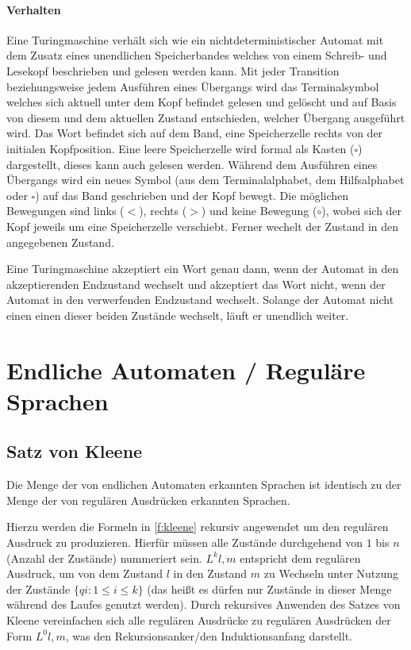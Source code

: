         \paragraph{Verhalten}
            Eine Turingmaschine verhält sich wie ein nichtdeterministischer Automat mit dem Zusatz eines unendlichen Speicherbandes welches von einem Schreib- und Lesekopf beschrieben und gelesen werden kann. Mit jeder Transition beziehungsweise jedem Ausführen eines Übergangs wird das Terminalsymbol welches sich aktuell unter dem Kopf befindet gelesen und gelöscht und auf Basis von diesem und dem aktuellen Zustand entschieden, welcher Übergang ausgeführt wird. Das Wort befindet sich auf dem Band, eine Speicherzelle rechts von der initialen Kopfposition. Eine leere Speicherzelle wird formal als Kasten ($ \square $) dargestellt, dieses kann auch gelesen werden. Während dem Ausführen eines Übergangs wird ein neues Symbol (aus dem Terminalalphabet, dem Hilfsalphabet oder $ \square $) auf das Band geschrieben und der Kopf bewegt. Die möglichen Bewegungen sind links ($ < $), rechts ($ > $) und keine Bewegung ($ \circ $), wobei sich der Kopf jeweils um eine Speicherzelle verschiebt. Ferner wechelt der Zustand in den angegebenen Zustand.

            Eine Turingmaschine akzeptiert ein Wort genau dann, wenn der Automat in den akzeptierenden Endzustand wechselt und akzeptiert das Wort nicht, wenn der Automat in den verwerfenden Endzustand wechselt. Solange der Automat nicht einen einen dieser beiden Zustände wechselt, läuft er unendlich weiter.


\section{Endliche Automaten / Reguläre Sprachen}
    \subsection{Satz von Kleene}
        Die Menge der von endlichen Automaten erkannten Sprachen ist identisch zu der Menge der von regulären Ausdrücken erkannten Sprachen.

        Hierzu werden die Formeln in \ref{f:kleene} rekursiv angewendet um den regulären Ausdruck zu produzieren. Hierfür müssen alle Zustände durchgehend von $ 1 $ bis $ n $ (Anzahl der Zustände) nummeriert sein. $ L ^ k  { l, m } $ entspricht dem regulären Ausdruck, um von dem Zustand $ l $ in den Zustand $ m $ zu Wechseln unter Nutzung der Zustände $ \{ q  i : 1 \leq i \leq k \} $ (das heißt es dürfen nur Zustände in dieser Menge während des Laufes genutzt werden). Durch rekursives Anwenden des Satzes von Kleene vereinfachen sich alle regulären Ausdrücke zu regulären Ausdrücken der Form $ L ^ 0  { l, m } $, was den Rekursionsanker/den Induktionsanfang darstellt.

